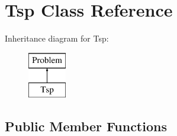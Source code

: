 \hypertarget{class_tsp}{\section{Tsp Class Reference}
\label{class_tsp}
}
Inheritance diagram for Tsp\+:\begin{figure}[H]
\begin{center}
\leavevmode
\includegraphics[height=2.000000cm]{class_tsp}
\end{center}
\end{figure}
\subsection*{Public Member Functions}
